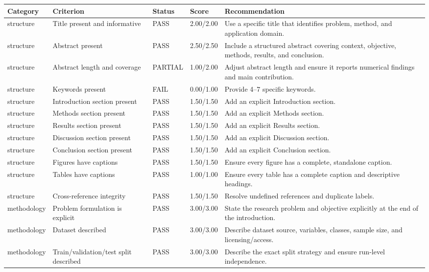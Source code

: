 \begin{longtable}{p{2.6cm}p{5.2cm}p{1.5cm}p{1.4cm}p{4.8cm}}
\toprule
Category & Criterion & Status & Score & Recommendation \\
\midrule
\endhead
structure & Title present and informative & PASS & 2.00/2.00 & Use a specific title that identifies problem, method, and application domain. \\
structure & Abstract present & PASS & 2.50/2.50 & Include a structured abstract covering context, objective, methods, results, and conclusion. \\
structure & Abstract length and coverage & PARTIAL & 1.00/2.00 & Adjust abstract length and ensure it reports numerical findings and main contribution. \\
structure & Keywords present & FAIL & 0.00/1.00 & Provide 4–7 specific keywords. \\
structure & Introduction section present & PASS & 1.50/1.50 & Add an explicit Introduction section. \\
structure & Methods section present & PASS & 1.50/1.50 & Add an explicit Methods section. \\
structure & Results section present & PASS & 1.50/1.50 & Add an explicit Results section. \\
structure & Discussion section present & PASS & 1.50/1.50 & Add an explicit Discussion section. \\
structure & Conclusion section present & PASS & 1.50/1.50 & Add an explicit Conclusion section. \\
structure & Figures have captions & PASS & 1.50/1.50 & Ensure every figure has a complete, standalone caption. \\
structure & Tables have captions & PASS & 1.00/1.00 & Ensure every table has a complete caption and descriptive headings. \\
structure & Cross-reference integrity & PASS & 1.50/1.50 & Resolve undefined references and duplicate labels. \\
methodology & Problem formulation is explicit & PASS & 3.00/3.00 & State the research problem and objective explicitly at the end of the introduction. \\
methodology & Dataset described & PASS & 3.00/3.00 & Describe dataset source, variables, classes, sample size, and licensing/access. \\
methodology & Train/validation/test split described & PASS & 3.00/3.00 & Describe the exact split strategy and ensure run-level independence. \\

\end{longtable}
